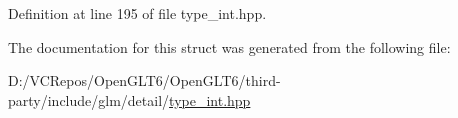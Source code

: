 Definition at line 195 of file type\+\_\+int.\+hpp.



The documentation for this struct was generated from the following file\+:\begin{DoxyCompactItemize}
\item 
D\+:/\+V\+C\+Repos/\+Open\+G\+L\+T6/\+Open\+G\+L\+T6/third-\/party/include/glm/detail/\mbox{\hyperlink{type__int_8hpp}{type\+\_\+int.\+hpp}}\end{DoxyCompactItemize}
